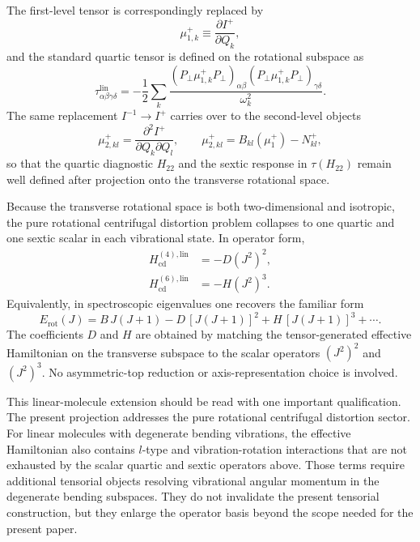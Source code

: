\documentclass[aip,jcp,reprint,floatfix]{revtex4-2}
\begin{document}
The first-level tensor is correspondingly replaced by
\begin{equation}
\mu_{1,k}^{+} \equiv \frac{\partial I^+}{\partial Q_k},
\end{equation}
and the standard quartic tensor is defined on the rotational subspace as
\begin{equation}
\tau_{\alpha\beta\gamma\delta}^{\mathrm{lin}}
=
-\frac12
\sum_k
\frac{
\left(P_{\perp}\mu_{1,k}^{+}P_{\perp}\right)_{\alpha\beta}
\left(P_{\perp}\mu_{1,k}^{+}P_{\perp}\right)_{\gamma\delta}
}{\omega_k^2}.
\label{eq:app_linear_tau}
\end{equation}
The same replacement $I^{-1}\to I^+$ carries over to the second-level objects
\begin{equation}
\mu_{2,kl}^{+}
=
\frac{\partial^2 I^+}{\partial Q_k\partial Q_l},
\qquad
\mu_{2,kl}^{+} = B_{kl}(\mu_1^{+}) - N_{kl}^{+},
\end{equation}
so that the quartic diagnostic $H_{22}$ and the sextic response in
$\tau(H_{22})$ remain well defined after projection onto the transverse
rotational space.

Because the transverse rotational space is both two-dimensional and isotropic,
the pure rotational centrifugal distortion problem collapses to one quartic and
one sextic scalar in each vibrational state. In operator form,
\begin{align}
H_{\mathrm{cd}}^{(4),\mathrm{lin}} &= -D \left(J^2\right)^2, \\
H_{\mathrm{cd}}^{(6),\mathrm{lin}} &= -H \left(J^2\right)^3.
\end{align}
Equivalently, in spectroscopic eigenvalues one recovers the familiar form
\begin{equation}
E_{\mathrm{rot}}(J)
=
B\,J(J+1)
-D\,[J(J+1)]^2
+H\,[J(J+1)]^3+\cdots .
\end{equation}
The coefficients $D$ and $H$ are obtained by matching the tensor-generated
effective Hamiltonian on the transverse subspace to the scalar operators
$(J^2)^2$ and $(J^2)^3$. No asymmetric-top reduction or axis-representation
choice is involved.\cite{Aliev1986,Herzberg1945,AmatNielsenTarrago1971}

This linear-molecule extension should be read with one important qualification.
The present projection addresses the pure rotational centrifugal distortion
sector. For linear molecules with degenerate bending vibrations, the effective
Hamiltonian also contains $l$-type and vibration-rotation interactions that are
not exhausted by the scalar quartic and sextic operators above. Those terms
require additional tensorial objects resolving vibrational angular momentum in
the degenerate bending subspaces. They do not invalidate the present tensorial
construction, but they enlarge the operator basis beyond the scope needed for
the present paper.
\end{document}
